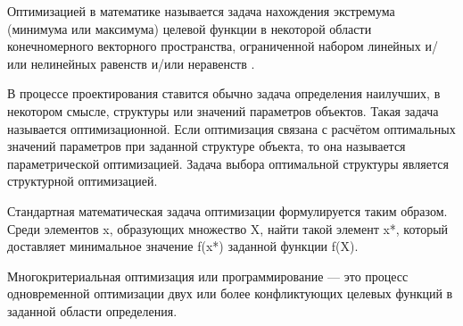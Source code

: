 \startprefacepage

Оптимизацией в математике называется задача нахождения экстремума (минимума или максимума) целевой функции в некоторой области конечномерного векторного пространства, ограниченной набором линейных и/или нелинейных равенств и/или неравенств \cite{wiki_opt}.

В процессе проектирования ставится обычно задача определения наилучших, в некотором смысле, структуры или значений параметров объектов. Такая задача называется оптимизационной. Если оптимизация связана с расчётом оптимальных значений параметров при заданной структуре объекта, то она называется параметрической оптимизацией. Задача выбора оптимальной структуры является структурной оптимизацией.

Стандартная математическая задача оптимизации формулируется таким образом. Среди элементов x, образующих множество X, найти такой элемент x*, который доставляет минимальное значение f(x*) заданной функции f(X).

Многокритериальная оптимизация или программирование — это процесс одновременной оптимизации двух или более конфликтующих целевых функций в заданной области определения.